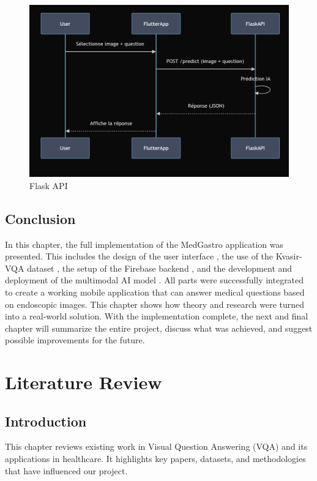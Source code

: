 \documentclass[12pt,a4paper]{report}
\begin{document}
\begin{figure}[H]
    \centering
    \includegraphics[width=1\linewidth]{b6dee05f-7cf6-4fc9-ba57-5efb7fa8ab2a.jpg}
    \caption{Flask API}
    \label{fig:enter-label}
\end{figure}

\section{Conclusion}
In this chapter, the full implementation of the MedGastro application was presented. This includes the design of the user interface , the use of the Kvasir-VQA dataset , the setup of the Firebase backend , and the development and deployment of the multimodal AI model . All parts were successfully integrated to create a working mobile application that can answer medical questions based on endoscopic images. This chapter shows how theory and research were turned into a real-world solution. With the implementation complete, the next and final chapter will summarize the entire project, discuss what was achieved, and suggest possible improvements for the future.

\chapter{Literature Review}
\section{Introduction}
This chapter reviews existing work in Visual Question Answering (VQA) and its applications in healthcare. It highlights key papers, datasets, and methodologies that have influenced our project.
\end{document}
